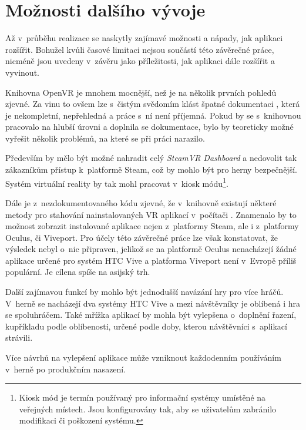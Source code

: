 \section{Možnosti dalšího
vývoje}\label{moux17enosti-dalux161uxedho-vuxfdvoje}

Až v~průběhu realizace se naskytly zajímavé možnosti a nápady, jak
aplikaci rozšířit. Bohužel kvůli časové limitaci nejsou součástí této
závěrečné práce, nicméně jsou uvedeny v~závěru jako příležitosti, jak
aplikaci dále rozšířit a vyvinout.

Knihovna OpenVR je mnohem mocnější, než je na několik prvních pohledů
zjevné. Za vinu to ovšem lze s~čistým svědomím klást špatné dokumentaci \autocite{openvrdocs},
která je nekompletní, nepřehledná a práce s~ní není příjemná. Pokud by
se s~knihovnou pracovalo na hlubší úrovni a doplnila se dokumentace,
bylo by teoreticky možné vyřešit několik problémů, na které se při práci narazilo.

Především by mělo být možné nahradit celý \emph{SteamVR Dashboard} a
nedovolit tak zákazníkům přístup k~platformě Steam, což by mohlo být pro
herny bezpečnější. Systém virtuální reality by tak mohl pracovat
v~kiosk módu\footnote{Kiosk mód je termín používaný pro informační systémy umístěné na veřejných místech. Jsou konfigurovány tak, aby se uživatelům zabránilo modifikaci či poškození systému.}. 

Dále je z~nezdokumentovaného kódu zjevné, že
v~knihovně existují některé metody pro stahování nainstalovaných VR
aplikací v~počítači \autocite{openvrhidden}. Znamenalo by to možnost zobrazit instalované aplikace
nejen z~platformy Steam, ale i z~platformy Oculus, či Viveport. Pro
účely této závěrečné práce lze však konstatovat, že výsledek nebyl o~nic
připraven, jelikož se na platformě Oculus nenacházejí žádné aplikace
určené pro systém HTC Vive a platforma Viveport není v~Evropě příliš
populární. Je cílena spíše na asijský trh. \autocite{viveportasia}

Další zajímavou funkcí by mohlo být jednodušší navázání hry pro více
hráčů. V~herně se nacházejí dva systémy HTC Vive a mezi návštěvníky je
oblíbená i hra se spoluhráčem. Také mřížka aplikací by mohla být vylepšena
o~doplnění řazení, kupříkladu podle oblíbenosti, určené podle doby, kterou
návštěvníci s~aplikací strávili.

Více návrhů na vylepšení aplikace může vzniknout každodenním používáním
v~herně po produkčním nasazení.
